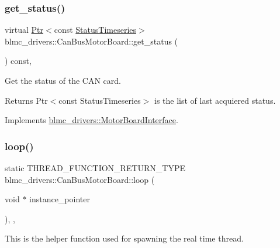 \subsubsection{\texorpdfstring{get\+\_\+status()}{get\_status()}}
{\footnotesize\ttfamily virtual \hyperlink{classblmc__drivers_1_1MotorBoardInterface_a6a733b7ed7a3a96f6b0712b6bb5307f8}{Ptr}$<$const \hyperlink{classblmc__drivers_1_1MotorBoardInterface_ae3777e484dda60c4abe87f2b542ddfb8}{Status\+Timeseries}$>$ blmc\+\_\+drivers\+::\+Can\+Bus\+Motor\+Board\+::get\+\_\+status (\begin{DoxyParamCaption}{ }\end{DoxyParamCaption}) const\hspace{0.3cm}{\ttfamily [inline]}, {\ttfamily [virtual]}}



Get the status of the C\+AN card. 

\begin{DoxyReturn}{Returns}
Ptr$<$const Status\+Timeseries$>$ is the list of last acquiered status. 
\end{DoxyReturn}


Implements \hyperlink{classblmc__drivers_1_1MotorBoardInterface_a13b1ffa7d10c1c753d76eaf5368714e3}{blmc\+\_\+drivers\+::\+Motor\+Board\+Interface}.

\mbox{\label{classblmc__drivers_1_1CanBusMotorBoard_af6d242ea933e9ad23c37167ba848f017}} 
\subsubsection{\texorpdfstring{loop()}{loop()}}
{\footnotesize\ttfamily static T\+H\+R\+E\+A\+D\+\_\+\+F\+U\+N\+C\+T\+I\+O\+N\+\_\+\+R\+E\+T\+U\+R\+N\+\_\+\+T\+Y\+PE blmc\+\_\+drivers\+::\+Can\+Bus\+Motor\+Board\+::loop (\begin{DoxyParamCaption}\item[{void $\ast$}]{instance\+\_\+pointer }\end{DoxyParamCaption})\hspace{0.3cm}{\ttfamily [inline]}, {\ttfamily [static]}, {\ttfamily [private]}}



This is the helper function used for spawning the real time thread. 


